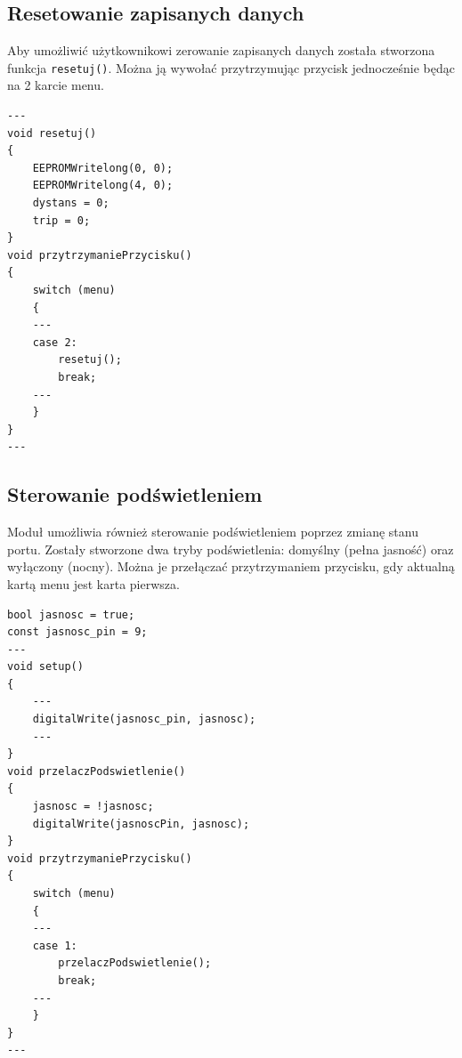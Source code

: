 \subsection{Resetowanie zapisanych danych}
Aby umożliwić użytkownikowi zerowanie zapisanych danych została stworzona funkcja \texttt{resetuj()}. Można ją wywołać przytrzymując przycisk jednocześnie będąc na 2 karcie menu.

\begin{lstlisting}[label=list:menu_card4,caption=Resetowanie zapisanych danych,
basicstyle=\footnotesize\ttfamily]
---
void resetuj()
{
    EEPROMWritelong(0, 0);
    EEPROMWritelong(4, 0);
    dystans = 0;
    trip = 0;
}
void przytrzymaniePrzycisku()
{
    switch (menu)
    {
    ---
    case 2:
        resetuj();
        break;
    ---
    }
}
---
\end{lstlisting}

\subsection{Sterowanie podświetleniem}
Moduł umożliwia również sterowanie podświetleniem poprzez zmianę stanu portu. Zostały stworzone dwa tryby podświetlenia: domyślny (pełna jasność) oraz wyłączony (nocny). Można je przełączać przytrzymaniem przycisku, gdy aktualną kartą menu jest karta pierwsza.

\begin{lstlisting}[label=list:hold_button_brightness,caption=Resetowanie zapisanych danych,
basicstyle=\footnotesize\ttfamily]
bool jasnosc = true;
const jasnosc_pin = 9;
---
void setup()
{
    ---
    digitalWrite(jasnosc_pin, jasnosc);
    ---
}
void przelaczPodswietlenie()
{
    jasnosc = !jasnosc;
    digitalWrite(jasnoscPin, jasnosc);
}
void przytrzymaniePrzycisku()
{
    switch (menu)
    {
    ---
    case 1:
        przelaczPodswietlenie();
        break;
    ---
    }
}
---
\end{lstlisting}
